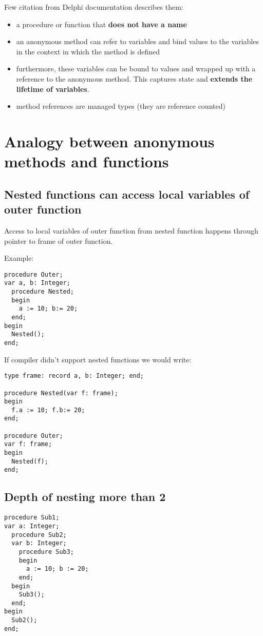 \documentclass[11pt]{article}
\begin{document}
Few citation from Delphi documentation describes them:
\begin{itemize}
\item a procedure or function that \textbf{does not have a name}
\item an anonymous method can refer to variables and bind values to the
  variables in the context in which the method is defined
\item furthermore, these variables can be bound to values and wrapped up
  with a reference to the anonymous method. This captures state and
  \textbf{extends the lifetime of variables}.
\item method references are managed types (they are reference counted)
\end{itemize}
\section{Analogy between anonymous methods and functions}
\label{sec-4}
\subsection{Nested functions can access local variables of outer function}
\label{sec-4-1}


Access to local variables of outer function from nested function
happens through pointer to frame of outer function.

Example:

\begin{verbatim}
procedure Outer;
var a, b: Integer;
  procedure Nested;
  begin
    a := 10; b:= 20;
  end;
begin
  Nested();
end;
\end{verbatim}

If compiler didn't support nested functions we would write:


\begin{verbatim}
type frame: record a, b: Integer; end;

procedure Nested(var f: frame);
begin
  f.a := 10; f.b:= 20;
end;

procedure Outer;
var f: frame;
begin
  Nested(f);
end;
\end{verbatim}
\subsection{Depth of nesting more than 2}
\label{sec-4-2}



\begin{verbatim}
procedure Sub1;
var a: Integer;
  procedure Sub2;
  var b: Integer;
    procedure Sub3;
    begin
      a := 10; b := 20;
    end;
  begin
    Sub3();
  end;
begin
  Sub2();
end;
\end{verbatim}
\end{document}
